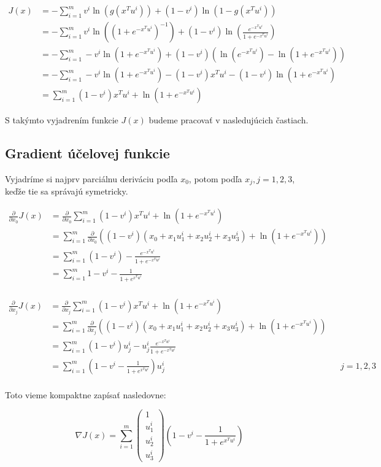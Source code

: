 \documentclass[report.tex]{subfiles}
\begin{document}
\begin{align*}
	J(x) &= -\sum_{i=1}^{m}v^i \ln \left(g\left(x^Tu^i\right)\right) 
	+ (1-v^i) \ln \left(1 - g\left(x^Tu^i\right)\right) \\
	&= -\sum_{i=1}^{m}v^i \ln \left(\left(1 + e^{-x^Tu^i}\right)^{-1}\right)
	+ (1-v^i) \ln \left(\frac{e^{-x^Tu^i}}{1 + e^{-x^Tu^i}}\right) \\
	&= -\sum_{i=1}^{m} -v^i \ln \left(1 + e^{-x^Tu^i}\right)
	+ (1-v^i) \left(\ln \left(e^{-x^Tu^i}\right) - \ln \left(1 + e^{-x^Tu^i}\right)\right) \\
	&= -\sum_{i=1}^{m} -v^i \ln \left(1 + e^{-x^Tu^i}\right)
	- (1-v^i) x^Tu^i - (1-v^i) \ln \left(1 + e^{-x^Tu^i}\right) \\
	&= \sum_{i=1}^{m} (1-v^i) x^Tu^i + \ln \left(1 + e^{-x^Tu^i}\right)
\end{align*}

S takýmto vyjadrením funkcie $J(x)$ budeme pracovať v nasledujúcich častiach.

\subsection{Gradient účelovej funkcie}

Vyjadríme si najprv parciálnu deriváciu podľa $x_0$, potom podľa $x_{j}, j=1,2,3$, keďže tie sa správajú symetricky.

\begin{align*}
	\frac{\partial}{\partial x_0} J(x) &= \frac{\partial}{\partial x_0} \sum_{i=1}^{m} (1-v^i) x^Tu^i + \ln \left(1 + e^{-x^Tu^i}\right)\\
	&= \sum_{i=1}^{m} \frac{\partial}{\partial x_0} \left((1-v^i)(x_0 + x_1u_1^i + x_2u_2^i + x_3u_3^i) + \ln \left(1 + e^{-x^Tu^i}\right) \right)\\
	&= \sum_{i=1}^{m} (1-v^i) - \frac{e^{-x^Tu^i}}{1 + e^{-x^Tu^i}}\\
	&= \sum_{i=1}^{m} 1-v^i - \frac{1}{1 + e^{x^Tu^i}}\\
\end{align*}

\begin{align*}
	\frac{\partial}{\partial x_j} J(x) &= \frac{\partial}{\partial x_j} \sum_{i=1}^{m} (1-v^i) x^Tu^i + \ln \left(1 + e^{-x^Tu^i}\right)\\
	&= \sum_{i=1}^{m} \frac{\partial}{\partial x_j} \left((1-v^i)(x_0 + x_1u_1^i + x_2u_2^i + x_3u_3^i) + \ln \left(1 + e^{-x^Tu^i}\right) \right)\\
	&= \sum_{i=1}^{m} (1-v^i)u_j^i - u_j^i\frac{ e^{-x^Tu^i}}{1 + e^{-x^Tu^i}}\\
	&= \sum_{i=1}^{m} \left(1-v^i - \frac{1}{1 + e^{x^Tu^i}}\right)u_j^i && j=1,2,3\\
\end{align*}

Toto vieme kompaktne zapísať nasledovne:

\begin{equation*}
	\nabla J(x) = \sum_{i=1}^{m} 
	\begin{pmatrix}
		1 \\
		u_1^i \\
		u_2^i \\
		u_3^i 
	\end{pmatrix}
	\left(1-v^i - \frac{1}{1 + e^{x^Tu^i}}\right)
\end{equation*}
\end{document}
